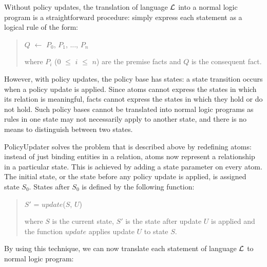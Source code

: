\documentclass[11pt]{llncs}
\begin{document}

      Without policy updates, the translation of language ${\cal L}$ into a
      normal logic program is a straightforward procedure: simply express each
      statement as a logical rule of the form:

      \begin{quote}
        $Q$ $\leftarrow$ $P_{0}$, $P_{1}$, ..., $P_{n}$

        where $P_{i}$ ($0$ $\leq$ $i$ $\leq$ $n$) are the premise facts and $Q$
        is the consequent fact.
      \end{quote}

      However, with policy updates, the policy base has states: a state
      transition occurs when a policy update is applied. Since atoms cannot
      express the states in which its relation is meaningful, facts cannot
      express the states in which they hold or do not hold. Such policy bases
      cannot be translated into normal logic programs as rules in one state
      may not necessarily apply to another state, and there is no means to
      distinguish between two states.

      PolicyUpdater solves the problem that is described above by redefining
      atoms: instead of just binding entities in a relation, atoms now
      represent a relationship in a particular state. This is achieved by
      adding a state parameter on every atom. The initial state, or the state
      before any policy update is applied, is assigned state $S_{0}$. States
      after $S_{0}$ is defined by the following function:

      \begin{quote}
        $S'$ = $update$($S$, $U$)

        where $S$ is the current state, $S'$ is the state after update $U$ is
        applied and the function $update$ applies update $U$ to state $S$.
      \end{quote}

      By using this technique, we can now translate each statement of language
      ${\cal L}$ to normal logic program:
\end{document}
